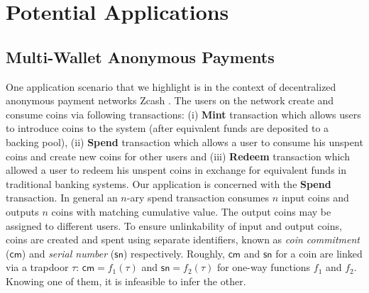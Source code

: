\section{Potential Applications}
\subsection{Multi-Wallet Anonymous Payments}\label{sec:application1}
One application scenario that we highlight is in the context of decentralized anonymous payment networks  Zcash \cite{zerocash}. 
The users on the network create and consume coins via following transactions: (i) {\bf Mint} transaction which allows users to introduce coins to the system (after equivalent funds are
deposited to a backing pool), (ii) {\bf Spend} transaction which allows a user to consume his unspent coins and create new coins for other users and 
(iii) {\bf Redeem} transaction which allowed a user to redeem his unspent coins in exchange for equivalent funds in traditional banking systems. Our application 
is concerned with the {\bf Spend} transaction. In general an $n$-ary spend transaction consumes $n$ input coins and outputs $n$ coins with matching 
cumulative value. The output coins may be assigned to different users. To ensure unlinkability of input and output coins, coins are created
and spent using separate identifiers, known as {\em coin commitment} ($\mathsf{cm}$) and {\em serial number} ($\mathsf{sn}$) respectively. 
Roughly, $\mathsf{cm}$
and $\mathsf{sn}$ for a coin are linked via a trapdoor $\tau$: $\mathsf{cm} = f_1(\tau)$ and $\mathsf{sn}=f_2(\tau)$ for one-way functions
$f_1$ and $f_2$. Knowing one of them, it is infeasible to infer the other.  
